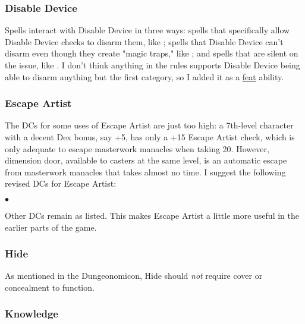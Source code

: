 \subsubsection{Disable Device}

Spells interact with Disable Device in three ways: spells that specifically allow Disable Device checks to disarm them, like ; spells that Disable Device can't disarm even though they create "magic traps," like ; and spells that are silent on the issue, like . I don't think anything in the rules supports Disable Device being able to disarm anything but the first category, so I added it as a \hyperref[comm:feat:professionalluddite]{feat} ability.

\subsubsection{Escape Artist}

The DCs for some uses of Escape Artist are just too high: a 7th-level character with a decent Dex bonus, say +5, has only a +15 Escape Artist check, which is only adequate to escape masterwork manacles when taking 20. However, dimension door, available to casters at the same level, is an automatic escape from masterwork manacles that takes almost no time. I suggest the following revised DCs for Escape Artist:

\begin{list}{$\bullet$}{\itemspace}
\end{list}

Other DCs remain as listed. This makes Escape Artist a little more useful in the earlier parts of the game.

\subsubsection{Hide}

As mentioned in the Dungeonomicon, Hide should \textit{not} require cover or concealment to function.

\subsubsection{Knowledge}

